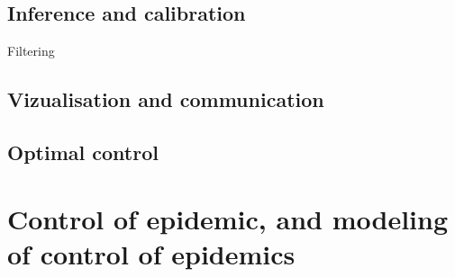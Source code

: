 \subsection{Inference and calibration} 
 Filtering
\subsection{Vizualisation and communication}
\subsection{Optimal control}



 \section{Control of epidemic, and modeling of control of epidemics}%




